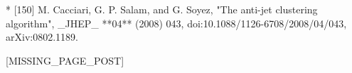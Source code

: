 * [150] M. Cacciari, G. P. Salam, and G. Soyez, "The anti-jet clustering algorithm", _JHEP_ **04** (2008) 043, doi:10.1088/1126-6708/2008/04/043, arXiv:0802.1189.

[MISSING_PAGE_POST]

 